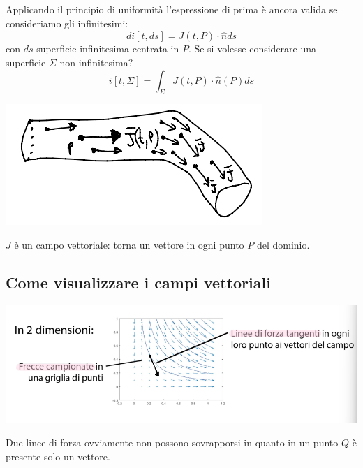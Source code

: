 Applicando il principio di uniformità l'espressione di prima è ancora valida se consideriamo gli infinitesimi:
\[
di[t,ds] = \overline{J}(t,P)\cdot\hat{n}ds
\]
con $ds$ superficie infinitesima centrata in $P$. Se si volesse considerare una superficie $\Sigma$ non infinitesima?
\[
    i[t,\Sigma] = \int_\Sigma\overline{J}(t,P)\cdot\hat{n}(P)ds
\]
\begin{center}
    \includegraphics[scale = 0.6]{immagini/image3.png}
\end{center}

$\overline{J}$ è un campo vettoriale: torna un vettore in ogni punto $P$ del dominio.

\subsection{Come visualizzare i campi vettoriali}
\begin{center}
    \includegraphics[scale = 0.6]{immagini/image4.png}
\end{center}
Due linee di forza ovviamente non possono sovrapporsi in quanto in un punto $Q$ è presente solo un vettore.
